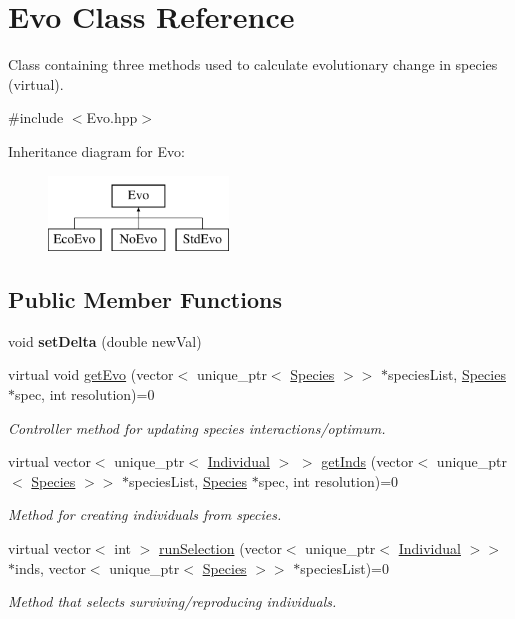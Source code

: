 \hypertarget{classEvo}{}\section{Evo Class Reference}
\label{classEvo}


Class containing three methods used to calculate evolutionary change in species (virtual).  




{\ttfamily \#include $<$Evo.\+hpp$>$}

Inheritance diagram for Evo\+:\begin{figure}[H]
\begin{center}
\leavevmode
\includegraphics[height=2.000000cm]{classEvo}
\end{center}
\end{figure}
\subsection*{Public Member Functions}
\begin{DoxyCompactItemize}
\item 
\mbox{\label{classEvo_adae2722f000f4838bae9743979b50328}} 
void {\bfseries set\+Delta} (double new\+Val)
\item 
virtual void \hyperlink{classEvo_a8c5208c00d1ee2fe9bef41bdd7fe0ab7}{get\+Evo} (vector$<$ unique\+\_\+ptr$<$ \hyperlink{classSpecies}{Species} $>$$>$ $\ast$species\+List, \hyperlink{classSpecies}{Species} $\ast$spec, int resolution)=0
\begin{DoxyCompactList}\small\item\em Controller method for updating species interactions/optimum. \end{DoxyCompactList}\item 
virtual vector$<$ unique\+\_\+ptr$<$ \hyperlink{classIndividual}{Individual} $>$ $>$ \hyperlink{classEvo_a88b5e0b1053cf1b4b473a08e2f03db92}{get\+Inds} (vector$<$ unique\+\_\+ptr$<$ \hyperlink{classSpecies}{Species} $>$$>$ $\ast$species\+List, \hyperlink{classSpecies}{Species} $\ast$spec, int resolution)=0
\begin{DoxyCompactList}\small\item\em Method for creating individuals from species. \end{DoxyCompactList}\item 
virtual vector$<$ int $>$ \hyperlink{classEvo_a10ff4eefe3967ff5cf5f820890c18079}{run\+Selection} (vector$<$ unique\+\_\+ptr$<$ \hyperlink{classIndividual}{Individual} $>$$>$ $\ast$inds, vector$<$ unique\+\_\+ptr$<$ \hyperlink{classSpecies}{Species} $>$$>$ $\ast$species\+List)=0
\begin{DoxyCompactList}\small\item\em Method that selects surviving/reproducing individuals. \end{DoxyCompactList}\end{DoxyCompactItemize}
